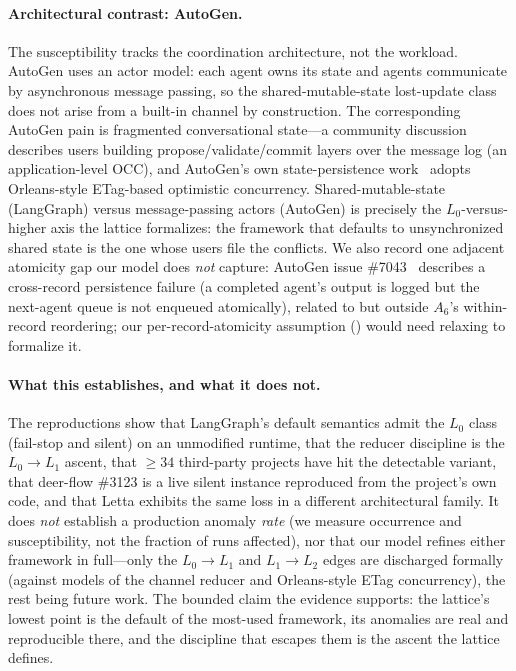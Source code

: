 \documentclass[journal,compsoc,10pt]{IEEEtran}
\providecommand{\citep}{\cite}
\theoremstyle{definition}
\theoremstyle{remark}
\begin{document}
\paragraph{Architectural contrast: AutoGen.}
The susceptibility tracks the coordination architecture, not the workload.
AutoGen uses an actor model: each agent owns its state and agents
communicate by asynchronous message passing, so the shared-mutable-state
lost-update class does not arise from a built-in channel by construction.
The corresponding AutoGen pain is fragmented conversational state---a
community discussion~\citep{AutoGenDiscussion7144} describes users building
propose/validate/commit layers over the message log (an application-level
OCC), and AutoGen's own state-persistence work~\citep{AutoGenPR3954} adopts
Orleans-style ETag-based optimistic concurrency. Shared-mutable-state
(LangGraph) versus message-passing actors (AutoGen) is precisely the
$L_0$-versus-higher axis the lattice formalizes: the framework that
defaults to unsynchronized shared state is the one whose users file the
conflicts. We also record one adjacent atomicity gap our model does
\emph{not} capture: AutoGen issue \#7043~\citep{AutoGenIssue7043} describes
a cross-record persistence failure (a completed agent's output is logged
but the next-agent queue is not enqueued atomically), related to but
outside $A_6$'s within-record reordering; our per-record-atomicity
assumption () would need relaxing to formalize it.

\paragraph{What this establishes, and what it does not.}
The reproductions show that LangGraph's default semantics admit the $L_0$
class (fail-stop and silent) on an unmodified runtime, that the reducer
discipline is the $L_0 \to L_1$ ascent, that $\geq 34$ third-party projects
have hit the detectable variant, that deer-flow \#3123 is a live silent
instance reproduced from the project's own code, and that Letta exhibits
the same loss in a different architectural family. It does \emph{not}
establish a production anomaly \emph{rate} (we measure occurrence and
susceptibility, not the fraction of runs affected), nor that our model
refines either framework in full---only the $L_0\to L_1$ and $L_1\to L_2$
edges are discharged formally (against models of the channel reducer and
Orleans-style ETag concurrency), the rest being future work. The bounded
claim the evidence supports: the lattice's lowest point is the default of
the most-used framework, its anomalies are real and reproducible there,
and the discipline that escapes them is the ascent the lattice defines.
\end{document}
